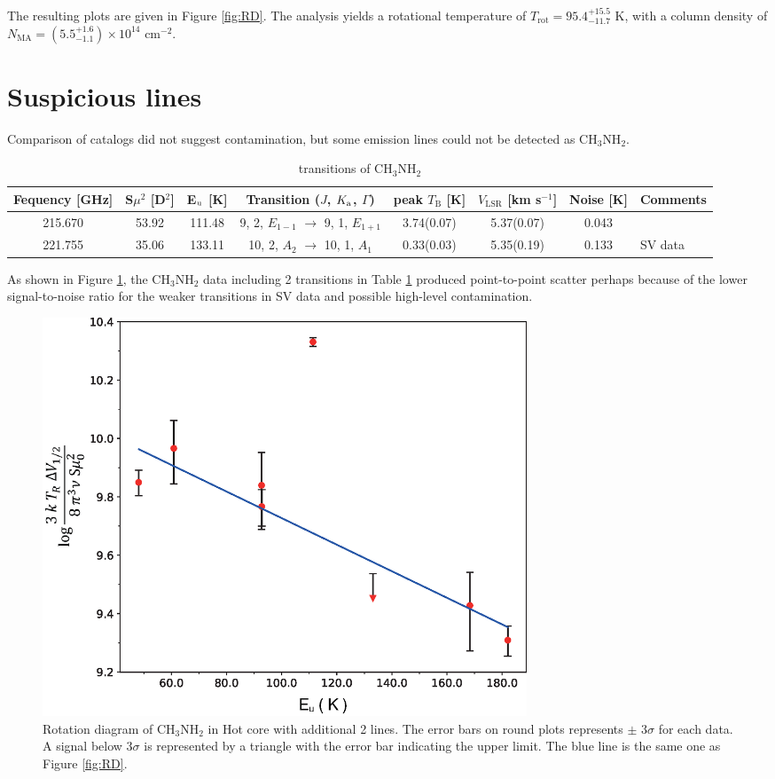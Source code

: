 The resulting plots are given in Figure \ref{fig:RD}.
The analysis yields a rotational temperature of $T_{\mathrm{rot}} =  95.4^{+15.5}_{-11.7} \,\,\mathrm{K}$, 
with a column density of $N_{\mathrm{MA}} = ( 5.5^{+1.6}_{-1.1} ) \times 10^{14} \,\,\mathrm{cm^{-2}}$.

\section{Suspicious lines}
Comparison of catalogs did not suggest contamination, but some emission lines could not be detected as CH$_{3}$NH$_{2}$.

\renewcommand{\arraystretch}{1.5}
\begin{table}[htb]
\begin{center}

  \caption{transitions of CH$_3$NH$_2$}
  \label{tab:unresolved}
{\scriptsize
  \begin{tabular}{cccccccl} \hline
   Fequency [GHz]& S$\mu ^{2}$ [D$^2$] & E$_{\rm{u}}$ [K]& Transition ($J$, $K_{\rm{a}}$, $\Gamma$) 
   & peak $T_{\mathrm{B}}$ [K] & $V_{\mathrm{LSR}}$ [km s$^{-1}$] & Noise [K]  &Comments \\ \hline 
    215.670 & 53.92 & 111.48 & 9, 2, $E_{1-1}$ $\rightarrow$ 9, 1, $E_{1+1}$  & 3.74(0.07) & 5.37(0.07) & 0.043 &  \\
    221.755 & 35.06 & 133.11 & 10, 2, $A_{2}$ $\rightarrow$ 10, 1, $A_{1}$ & 0.33(0.03)& 5.35(0.19) & 0.133 &SV data \\ \hline
  \end{tabular}
  }
\end{center}
\end{table}

As shown in Figure \ref{fig:RD_blend}, the CH$_{3}$NH$_{2}$ data including 2 transitions in Table \ref{tab:unresolved} 
produced point-to-point scatter perhaps because of the lower signal-to-noise ratio for the weaker transitions in SV data 
and possible high-level contamination.

\begin{figure}[htp]
  \centering
  \includegraphics[width=0.7\textwidth]{OrionKL/RD_blend.eps}
  \caption{Rotation diagram of CH$_{3}$NH$_{2}$ in Hot core with additional 2 lines. The error bars on round plots represents $\pm$ 3$\sigma$ for each data. A signal below 3$\sigma$ is represented by a triangle with the error bar indicating the upper limit. The blue line is the same one as Figure \ref{fig:RD}.}
  \label{fig:RD_blend}
\end{figure}

